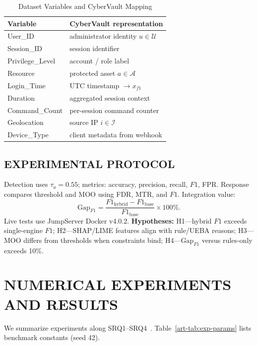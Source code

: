 \begin{table}[H]
\caption{Dataset Variables and CyberVault Mapping}
\label{art-tab:variables}
\centering
\small
\begin{tabular}{ll}
\toprule
\textbf{Variable} & \textbf{CyberVault representation} \\
\midrule
User\_ID & administrator identity $u\in\mathcal{U}$ \\
Session\_ID & session identifier \\
Privilege\_Level & account / role label \\
Resource & protected asset $a\in\mathcal{A}$ \\
Login\_Time & UTC timestamp $\rightarrow x_{f1}$ \\
Duration & aggregated session context \\
Command\_Count & per-session command counter \\
Geolocation & source IP $i\in\mathcal{I}$ \\
Device\_Type & client metadata from webhook \\
\bottomrule
\end{tabular}
\end{table}

\subsection{EXPERIMENTAL PROTOCOL}
Detection uses $\tau_a=0.55$; metrics: accuracy, precision, recall, $F1$, FPR. Response compares threshold and MOO using FDR, MTR, and $F1$. Integration value:
\begin{equation}
\mathrm{Gap}_{F1}=\frac{F1_{\mathrm{hybrid}}-F1_{\mathrm{base}}}{F1_{\mathrm{base}}}\times 100\%.
\label{art-eq:gap}
\end{equation}
Live tests use JumpServer Docker v4.0.2. \textbf{Hypotheses:} H1---hybrid $F1$ exceeds single-engine $F1$; H2---SHAP/LIME features align with rule/UEBA reasons; H3---MOO differs from thresholds when constraints bind; H4---$\mathrm{Gap}_{F1}$ versus rules-only exceeds 10\%.

\section{NUMERICAL EXPERIMENTS AND RESULTS}
\label{art-sec:experiments}

We summarize experiments along SRQ1--SRQ4~\cite{ref14}. Table~\ref{art-tab:exp-params} lists benchmark constants (seed 42).

